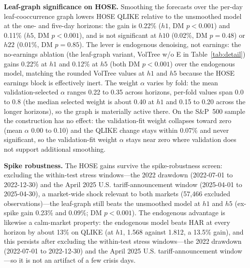 \documentclass[runningheads,a4paper]{llncs}
\begin{document}
\textbf{Leaf-graph significance on HOSE.} Smoothing the forecasts over the per-day leaf-cooccurrence graph
lowers HOSE QLIKE relative to the unsmoothed model at the one- and five-day
horizons: the gain is 0.22\% ($h1$, DM $p<0.001$) and 0.11\% ($h5$, DM $p<0.001$), and is not
significant at $h10$ (0.02\%, DM $p=0.48$) or $h22$ (0.01\%, DM $p=0.85$).
The lever is endogenous denoising, not earnings: the no-earnings ablation (the leaf-graph variant, VolTree w/o E in
Table~\ref{tab:detail}) gains 0.22\% at $h1$ and 0.12\% at $h5$ (both DM $p<0.001$) over
the endogenous model, matching the rounded VolTree values at $h1$ and $h5$ because the HOSE earnings block is effectively
inert.
The weight $\alpha$ varies by fold: the mean validation-selected $\alpha$ ranges 0.22 to 0.35 across
horizons, per-fold values span 0.0 to 0.8 (the median selected weight is about 0.40 at $h1$ and 0.15 to 0.20 across
the longer horizons), so the graph is materially active there. On the S\&P~500 sample the construction has no effect:
the validation-fit weight collapses toward zero (mean $\alpha$ 0.00 to 0.10) and the QLIKE change stays
within 0.07\% and never significant, so the validation-fit weight $\alpha$ stays near zero where validation
does not support additional smoothing.

\textbf{Spike robustness.} The HOSE gains survive the spike-robustness screen: excluding the within-test
stress windows---the 2022 drawdown (2022-07-01 to 2022-12-30) and the April 2025 U.S.
tariff-announcement window (2025-04-01 to 2025-04-30), a market-wide shock relevant to both markets
(57{,}466 excluded observations)---the leaf-graph still beats the unsmoothed model at
$h1$ and $h5$ (ex-spike gain 0.23\% and 0.09\%; DM $p<0.001$).
The endogenous advantage is likewise a calm-market property: the endogenous model beats HAR at every
horizon by about 13\% on QLIKE (at $h1$, 1.568 against 1.812, a 13.5\% gain), and this persists after
excluding the within-test stress windows---the 2022 drawdown (2022-07-01 to 2022-12-30) and the April 2025
U.S. tariff-announcement window---so it is not an artifact of a few crisis days.
\end{document}
